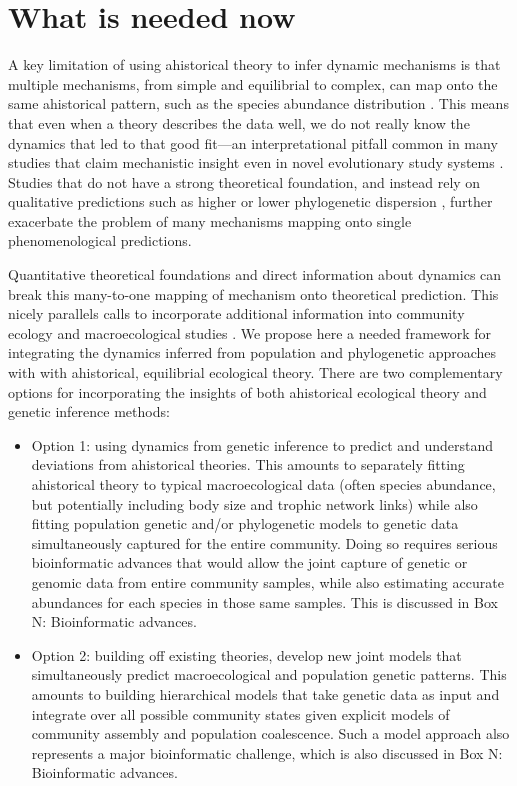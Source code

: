 \documentclass[12pt]{article}
\newcounter{Box}
\begin{document}
\section{What is needed now}

A key limitation of using ahistorical theory to infer dynamic
mechanisms is that multiple mechanisms, from simple and equilibrial to
complex, can map onto the same ahistorical pattern, such as the
species abundance distribution \cite{Kendall1948-pj, Kendall1948-ri,
  Engen1996-jt, Engen1996-na, McGill2003-sf}.  This means that even
when a theory describes the data well, we do not really know the
dynamics that led to that good fit---an interpretational pitfall
common in many studies that claim mechanistic insight even in novel
evolutionary study systems \cite{Hubbell2001-dx, Olszewski2004-ud,
  Wagner2006-te}.  Studies that do not have a strong theoretical
foundation, and instead rely on qualitative predictions such as higher
or lower phylogenetic dispersion \cite{Webb2002-yr}, further
exacerbate the problem of many mechanisms mapping onto single
phenomenological predictions.

Quantitative theoretical foundations and direct information about
dynamics can break this many-to-one mapping of mechanism onto
theoretical prediction. This nicely parallels calls to incorporate
additional information into community ecology and macroecological
studies \cite{McGill2007-zd}. We propose here a needed
framework for integrating the dynamics inferred from population and
phylogenetic approaches with with ahistorical, equilibrial ecological
theory. There are two complementary options for incorporating the
insights of both ahistorical ecological theory and genetic inference
methods:

\begin{itemize}
\item Option 1: using dynamics from genetic inference to predict and
  understand deviations from ahistorical theories. This amounts to
  separately fitting ahistorical theory to typical macroecological
  data (often species abundance, but potentially including body size
  and trophic network links) while also fitting population genetic
  and/or phylogenetic models to genetic data simultaneously captured
  for the entire community. Doing so requires serious bioinformatic
  advances that would allow the joint capture of genetic or genomic
  data from entire community samples, while also estimating accurate
  abundances for each species in those same samples. This is discussed
  in Box N: Bioinformatic advances.
\item Option 2: building off existing theories, develop new joint
  models that simultaneously predict macroecological and population
  genetic patterns. This amounts to building hierarchical models that
  take genetic data as input and integrate over all possible community
  states given explicit models of community assembly and population
  coalescence. Such a model approach also represents a major
  bioinformatic challenge, which is also discussed in Box N:
  Bioinformatic advances.
\end{itemize}
\end{document}
